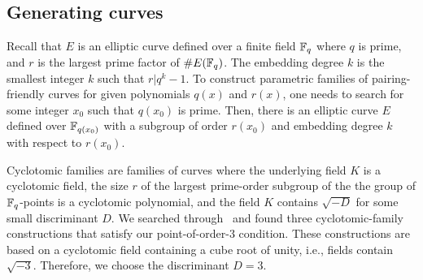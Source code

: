 

\subsection{Generating curves}
\label{subsec:gencurves}

Recall that $E$ is an elliptic curve defined over a finite field $\mathbb{F}_{q}$ where $q$ is prime,
and $r$ is the largest prime factor of $\# E(\mathbb{F}_{q})$.
The embedding degree $k$ is the smallest integer $k$ such that $r | q^k -1$.
To construct parametric families of pairing-friendly curves for given polynomials $q(x)$ and $r(x)$,
one needs to search for some integer $x_0$ such that $q(x_0)$ is prime.
Then, there is an elliptic curve $E$ defined over $\mathbb{F}_{q(x_0)}$ with a subgroup
of order $r(x_0)$ and embedding degree $k$ with respect to $r(x_0)$.

Cyclotomic families are families of curves where the underlying field $K$ is a cyclotomic field,
the size $r$ of the largest prime-order subgroup of the the group of $\mathbb{F}_{q}$-points is a cyclotomic polynomial,
and the field $K$ contains $\sqrt{-D}$ for some small discriminant $D$.
We searched through~\cite{2010/freeman} and found three cyclotomic-family constructions that satisfy our point-of-order-3 condition.
These constructions are based on a cyclotomic field containing a cube root of unity,
i.e., fields contain $\sqrt{-3}$.
Therefore, we choose the discriminant $D = 3$.

